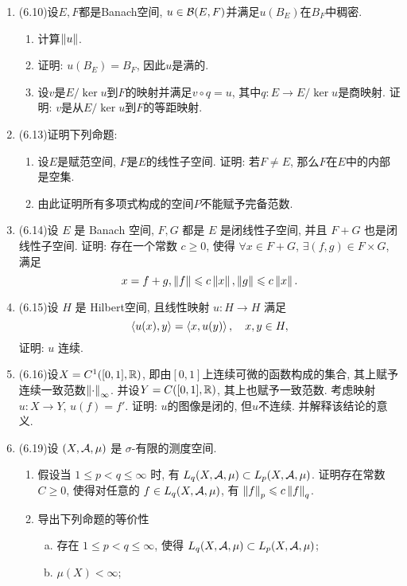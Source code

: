 \begin{enumerate}[label=\textbf{\arabic*.}, ref=\arabic*]
	\item (6.10)设$ E, F $都是Banach空间, $ u\in\mathcal{B}(E,F) $并满足$ u(B_E) $在$ B_F $中稠密.
		\begin{enumerate}[(1)]
		\item 计算$ \left\| u \right\| $.
		\item 证明: $ u(B_E)=B_F $, 因此$ u $是满的.
		\item 设$ v $是$ E/\ker u $到$ F $的映射并满足$ v\circ q=u $, 其中$ q : E\to E/\ker u $是商映射. 证明: $ v $是从$ E/\ker u $到$ F $的等距映射. 
		\end{enumerate}
	\item (6.13)证明下列命题:
		\begin{enumerate}[(1)]
		\item 设$ E $是赋范空间, $ F $是$ E $的线性子空间. 证明: 若$ F\ne E $, 那么$ F $在$ E $中的内部是空集.
		\item 由此证明所有多项式构成的空间$ P $不能赋予完备范数. 
		\end{enumerate}
	\item (6.14)设 $ E $ 是 Banach 空间, $ F, G $ 都是 $ E $ 是闭线性子空间, 并且 $ F+G $ 也是闭线性子空间. 证明: 存在一个常数 $ c\geqslant0 $, 使得 $ \forall x\in F+G $, $ \exists(f, g)\in F\times G $, 满足 
		\[
			x=f+g, \left\| f \right\|\leqslant c\left\| x \right\|, \left\| g \right\|\leqslant c\left\| x \right\|.
		\]
	\item (6.15)设 $ H $ 是 Hilbert空间, 且线性映射 $ u:H\to H $ 满足
		\[
			\left\langle u(x), y \right\rangle=\left\langle x, u(y) \right\rangle, \quad x, y\in H,
		\]
		证明: $ u $ 连续. 
	\item (6.16)设$ X=C^1([0,1],\mathbb{R}) $, 即由$ [0,1] $上连续可微的函数构成的集合, 其上赋予连续一致范数$ \left\| \cdot \right\|_\infty $. 并设$ Y=C([0,1],\mathbb{R}) $, 其上也赋予一致范数. 考虑映射$ u : X\to Y $, $ u(f)=f' $. 证明: $ u $的图像是闭的, 但$ u $不连续. 并解释该结论的意义. 
	\item (6.19)设 $ (X, \mathcal{A}, \mu) $ 是 $ \sigma $-有限的测度空间.
		\begin{enumerate}[(1)]
			\item 假设当 $ 1\leqslant p<q\leqslant\infty $ 时, 有 $ L_{q}(X, \mathcal{A}, \mu)\subset L_{p}(X, \mathcal{A}, \mu) $. 证明存在常数 $ C\geqslant0 $, 使得对任意的 $ f\in L_{q}(X, \mathcal{A}, \mu) $, 有 $ \left\| f \right\|_{p}\leqslant c\left\| f \right\|_{q} $.
			\item 导出下列命题的等价性
			\begin{enumerate}[a. ]
				\item 存在 $ 1\leqslant p<q\leqslant\infty $, 使得 $ L_{q}(X, \mathcal{A}, \mu)\subset L_{p}(X, \mathcal{A}, \mu) $;
				\item $ \mu(X)<\infty $;

\end{enumerate}
\end{enumerate}
\end{enumerate}
